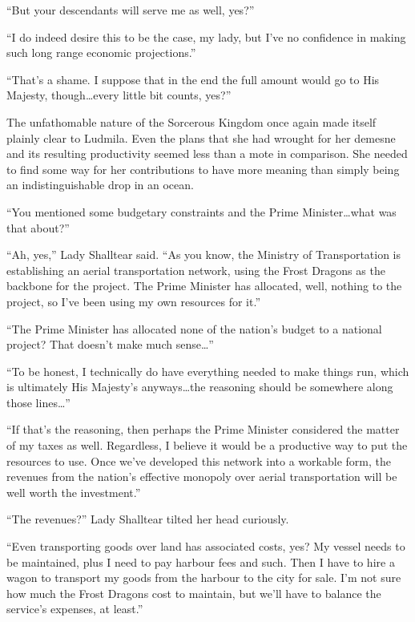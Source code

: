 “But your descendants will serve me as well, yes?”

 

“I do indeed desire this to be the case, my lady, but I’ve no confidence in making such long range economic projections.”

 

“That’s a shame. I suppose that in the end the full amount would go to His Majesty, though…every little bit counts, yes?”

 

The unfathomable nature of the Sorcerous Kingdom once again made itself plainly clear to Ludmila. Even the plans that she had wrought for her demesne and its resulting productivity seemed less than a mote in comparison. She needed to find some way for her contributions to have more meaning than simply being an indistinguishable drop in an ocean.

 

“You mentioned some budgetary constraints and the Prime Minister…what was that about?”

 

“Ah, yes,” Lady Shalltear said. “As you know, the Ministry of Transportation is establishing an aerial transportation network, using the Frost Dragons as the backbone for the project. The Prime Minister has allocated, well, nothing to the project, so I’ve been using my own resources for it.”

 

“The Prime Minister has allocated none of the nation’s budget to a national project? That doesn’t make much sense…”

 

“To be honest, I technically do have everything needed to make things run, which is ultimately His Majesty’s anyways…the reasoning should be somewhere along those lines…”

 

“If that’s the reasoning, then perhaps the Prime Minister considered the matter of my taxes as well. Regardless, I believe it would be a productive way to put the resources to use. Once we’ve developed this network into a workable form, the revenues from the nation’s effective monopoly over aerial transportation will be well worth the investment.”

 

“The revenues?” Lady Shalltear tilted her head curiously.

 

“Even transporting goods over land has associated costs, yes? My vessel needs to be maintained, plus I need to pay harbour fees and such. Then I have to hire a wagon to transport my goods from the harbour to the city for sale. I’m not sure how much the Frost Dragons cost to maintain, but we’ll have to balance the service’s expenses, at least.”

